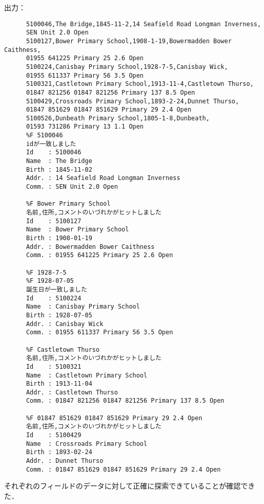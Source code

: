       出力：
      \begin{verbatim}
      5100046,The Bridge,1845-11-2,14 Seafield Road Longman Inverness,
      SEN Unit 2.0 Open
      5100127,Bower Primary School,1908-1-19,Bowermadden Bower Caithness,
      01955 641225 Primary 25 2.6 Open
      5100224,Canisbay Primary School,1928-7-5,Canisbay Wick,
      01955 611337 Primary 56 3.5 Open
      5100321,Castletown Primary School,1913-11-4,Castletown Thurso,
      01847 821256 01847 821256 Primary 137 8.5 Open
      5100429,Crossroads Primary School,1893-2-24,Dunnet Thurso,
      01847 851629 01847 851629 Primary 29 2.4 Open
      5100526,Dunbeath Primary School,1805-1-8,Dunbeath,
      01593 731286 Primary 13 1.1 Open
      %F 5100046
      idが一致しました
      Id    : 5100046
      Name  : The Bridge
      Birth : 1845-11-02
      Addr. : 14 Seafield Road Longman Inverness
      Comm. : SEN Unit 2.0 Open
      
      %F Bower Primary School
      名前,住所,コメントのいづれかがヒットしました
      Id    : 5100127
      Name  : Bower Primary School
      Birth : 1908-01-19
      Addr. : Bowermadden Bower Caithness
      Comm. : 01955 641225 Primary 25 2.6 Open

      %F 1928-7-5
      %F 1928-07-05
      誕生日が一致しました
      Id    : 5100224
      Name  : Canisbay Primary School
      Birth : 1928-07-05
      Addr. : Canisbay Wick
      Comm. : 01955 611337 Primary 56 3.5 Open
      
      %F Castletown Thurso
      名前,住所,コメントのいづれかがヒットしました
      Id    : 5100321
      Name  : Castletown Primary School
      Birth : 1913-11-04
      Addr. : Castletown Thurso
      Comm. : 01847 821256 01847 821256 Primary 137 8.5 Open
      
      %F 01847 851629 01847 851629 Primary 29 2.4 Open
      名前,住所,コメントのいづれかがヒットしました
      Id    : 5100429
      Name  : Crossroads Primary School
      Birth : 1893-02-24
      Addr. : Dunnet Thurso
      Comm. : 01847 851629 01847 851629 Primary 29 2.4 Open
      \end{verbatim}
      それぞれのフィールドのデータに対して正確に探索できていることが確認できた．

